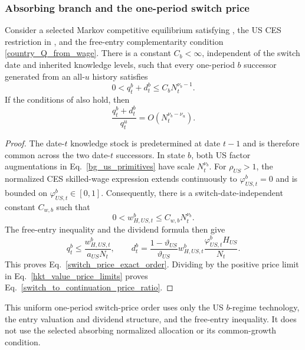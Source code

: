 \documentclass{article}
\def\green#1{#1}%
\begin{document}
\subsubsection{Absorbing branch and the one-period switch price}

\begin{lem}\label{lem_switch_price_order}
\green{Consider a selected Markov competitive equilibrium satisfying }, \green{the US CES restriction in} , and the \green{free-entry complementarity condition \eqref{country_Q_from_wage}}.  There is a constant $C_b<\infty$, independent of the switch date and inherited knowledge levels, such that every one-period $b$ successor generated from an all-$u$ history satisfies
\begin{equation}\label{switch_price_exact_order}
0<q_t^b+d_t^b
\le
C_bN_t^{\nu_b-1}.
\end{equation}
If the conditions of  also hold, then
\begin{equation}\label{switch_to_continuation_price_ratio}
\frac{q_t^b+d_t^b}{q_t^u}
=O(N_t^{\nu_b-\nu_u}).
\end{equation}
\end{lem}

\begin{proof}
The date-$t$ knowledge stock is predetermined at date $t-1$ and is therefore common across the two date-$t$ successors.  In state $b$, both US factor augmentations in Eq.~\eqref{bg_us_primitives} have scale $N_t^{\nu_b}$.  For $\rho_{US}>1$, the normalized CES skilled-wage expression extends continuously to $\varphi_{US,t}^b=0$ and is bounded on $\varphi_{US,t}^b\in[0,1]$.  Consequently, there is a switch-date-independent constant $C_{w,b}$ such that
\[
0<w_{H,US,t}^b\le C_{w,b}N_t^{\nu_b}.
\]
\green{The free-entry inequality} and the \green{dividend formula} then give
\[
q_t^b
\green{\le}\frac{w_{H,US,t}^b}{a_{US}N_t},
\qquad
d_t^b
=
\frac{1-\vartheta_{US}}{\vartheta_{US}}
\green{w}_{\green{H},\green{US},\green{t}}^\green{b}\frac{\varphi_{US,t}^bH_{US}}{\green{N}_\green{t}}.
\]
This proves Eq.~\eqref{switch_price_exact_order}.  Dividing by the positive price limit in Eq.~\eqref{hkt_value_price_limits} proves Eq.~\eqref{switch_to_continuation_price_ratio}.
\end{proof}

This uniform \green{one-period} switch-price order \green{uses only} the \green{US} $\green{b}$\green{-regime technology}, \green{the entry valuation} and \green{dividend structure}, \green{and the free-entry inequality}.  It does not \green{use the selected absorbing} normalized \green{allocation} or \green{its common-growth condition}.
\end{document}
